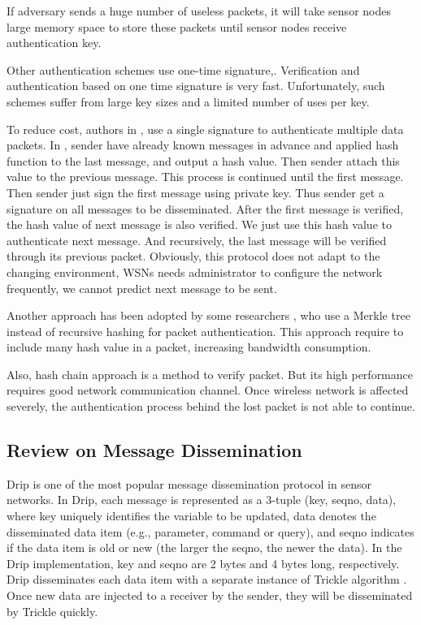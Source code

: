 \documentclass{sig-alternate-05-2015}
\begin{document}
If adversary sends a huge number of useless packets, it will take sensor nodes large memory space to store these packets until sensor nodes receive authentication key.

Other authentication schemes use one-time signature\cite{Biba},\cite{HORSIC}. Verification and authentication based on one time signature is very fast. Unfortunately, such schemes suffer from large key sizes and a limited number of uses per key.

To reduce cost, authors in \cite{aspect}, \cite{aspect} use a single signature to authenticate multiple data packets. In \cite{aspect}, sender have already known messages in advance and applied hash function to the last message, and output a hash value. Then sender attach this value to the previous message. This process is continued until the first message. Then sender just sign the first message using private key. Thus sender get a signature on all messages to be disseminated. After the first message is verified, the hash value of next message is also verified. We just use this hash value to authenticate next message. And recursively, the last message will be verified through its previous packet. Obviously, this protocol does not adapt to the changing environment, WSNs needs administrator to configure the network frequently, we cannot predict next message to be sent. 


Another approach has been adopted by some researchers \cite{hashtree}, who use a Merkle tree instead of recursive hashing for packet authentication. This approach require to include many hash value in a packet, increasing bandwidth consumption.

Also, hash chain approach \cite{nested} is a method to verify packet. But its high performance requires good network communication channel. Once wireless network is affected severely, the authentication process behind the lost packet is not able to continue.
 
\subsection{Review on Message Dissemination}
Drip is one of the most popular message dissemination protocol in sensor networks. In Drip, each message is represented as a 3-tuple (key, seqno, data), where key uniquely identifies the variable to be updated, data denotes the disseminated data item (e.g., parameter, command or query), and seqno indicates if the data item is old or new (the larger the seqno, the newer the data). In the Drip implementation, key and seqno are 2 bytes and 4 bytes long, respectively. Drip disseminates each data item with a separate instance of Trickle algorithm \cite{trickle}. Once new data are injected to a receiver by the sender, they will be disseminated by Trickle quickly.
\end{document}
